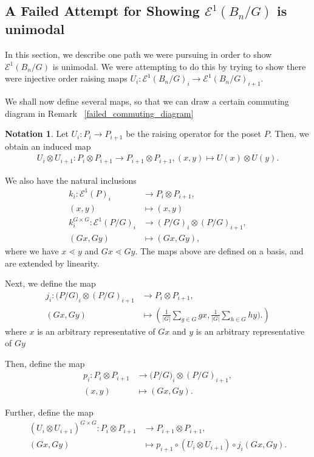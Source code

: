\documentclass[10 pt]{amsart}
\theoremstyle{plain}
\theoremstyle{definition}
\newtheorem{note}[thm]{Notation}
\theoremstyle{remark}
\numberwithin{equation}{section}
\newcommand\ssec{\subsection}
\begin{document}
\ssec{A Failed Attempt for Showing $\mathcal E^1(B_n/G)$ is unimodal}

In this section, we describe one path we were pursuing in order to show $\mathcal E^1(B_n/G)$ is unimodal. We were attempting to do this by trying to show there were injective order raising maps $U_i:\mathcal E^1(B_n/G)_i \rightarrow \mathcal E^1(B_n/G)_{i+1}.$

We shall now define several maps, so that we can draw a certain commuting diagram in Remark ~\ref{failed_commuting_diagram}


\begin{note}
Let $U_i:P_i \rightarrow P_{i+1}$ be the raising operator for the poset $P.$ Then, we obtain an induced map
\begin{align*}
	U_i \otimes U_{i+1}:P_i\otimes P_{i+1} \rightarrow P_{i+1} \otimes P_{i+1},(x,y) \mapsto U(x) \otimes U(y).
\end{align*}

We also have the natural inclusions
\begin{align*}
	k_i:\mathcal E^1(P)_i &\rightarrow P_i \otimes P_{i+1},\\
	(x, y) &\mapsto (x, y)\\
	k_i^{G\times G}:\mathcal E^1(P/G)_i &\rightarrow (P/G)_i \otimes (P/G)_{i+1},\\
	(Gx, Gy) &\mapsto (Gx, Gy),
\end{align*}
where we have $x \lessdot y$ and $Gx \lessdot Gy.$ The maps above are defined on a basis, and are extended by linearity.

Next, we define the map
\begin{align*}
	j_i:\mathcal (P/G)_i \otimes (P/G)_{i+1} & \rightarrow P_i \otimes P_{i+1},\\
	(Gx, Gy) &\mapsto \left(\frac{1}{|G|}\sum_{g \in G}^{} gx, \frac{1}{|G|}\sum_{h\in G}^{}hy).\right)
\end{align*}
where $x$ is an arbitrary representative of $Gx$ and $y$ is an arbitrary representative of $Gy$

Then, define the map
\begin{align*}
	p_i: P_i \otimes P_{i+1} &\rightarrow \mathcal (P/G)_i \otimes (P/G)_{i+1},\\
	(x, y) &\mapsto (Gx, Gy).
\end{align*}

Further, define the map 
\begin{align*}
	(U_i \otimes U_{i+1})^{G\times G}:P_i\otimes P_{i+1} &\rightarrow P_{i+1} \otimes P_{i+1},\\
	(Gx, Gy) &\mapsto p_{i+1}\circ(U_i \otimes U_{i+1})\circ j_i(Gx, Gy).
\end{align*}


\end{note}
\end{document}
